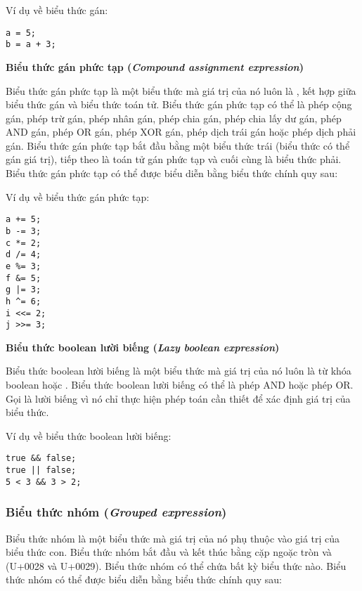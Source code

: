\regexassignexpr

\noindent Ví dụ về biểu thức gán:
\begin{lstlisting}[]
a = 5;
b = a + 3;
\end{lstlisting}

\noindent\textbf{Biểu thức gán phức tạp (\textit{Compound assignment expression})}

    Biểu thức gán phức tạp là một biểu thức mà giá trị của nó luôn là , kết hợp giữa biểu thức gán và biểu thức toán tử. Biểu thức gán phức tạp có thể là phép cộng gán, phép trừ gán, phép nhân gán, phép chia gán, phép chia lấy dư gán, phép AND gán, phép OR gán, phép XOR gán, phép dịch trái gán hoặc phép dịch phải gán. Biểu thức gán phức tạp bắt đầu bằng một biểu thức trái (biểu thức có thể gán giá trị), tiếp theo là toán tử gán phức tạp và cuối cùng là biểu thức phải. Biểu thức gán phức tạp có thể được biểu diễn bằng biểu thức chính quy sau: 

\regexcompoundassignexpr

\noindent Ví dụ về biểu thức gán phức tạp:
\begin{lstlisting}[]
a += 5;
b -= 3;
c *= 2;
d /= 4;
e %= 3;
f &= 5;
g |= 3;
h ^= 6;
i <<= 2;
j >>= 3;
\end{lstlisting}

\noindent\textbf{Biểu thức boolean lười biếng (\textit{Lazy boolean expression})}

    Biểu thức boolean lười biếng là một biểu thức mà giá trị của nó luôn là từ khóa boolean  hoặc . Biểu thức boolean lười biếng có thể là phép AND hoặc phép OR. Gọi là lười biếng vì nó chỉ thực hiện phép toán cần thiết để xác định giá trị của biểu thức.

\regexlazyboolexpr

\noindent Ví dụ về biểu thức boolean lười biếng:
\begin{lstlisting}[]
true && false;
true || false;
5 < 3 && 3 > 2;
\end{lstlisting}

\subsubsection{Biểu thức nhóm (\textit{Grouped expression})}

    Biểu thức nhóm là một biểu thức mà giá trị của nó phụ thuộc vào giá trị của biểu thức con. Biểu thức nhóm bắt đầu và kết thúc bằng cặp ngoặc tròn \kw{(} và \kw{)} (U+0028 và U+0029). Biểu thức nhóm có thể chứa bất kỳ biểu thức nào. Biểu thức nhóm có thể được biểu diễn bằng biểu thức chính quy sau:

